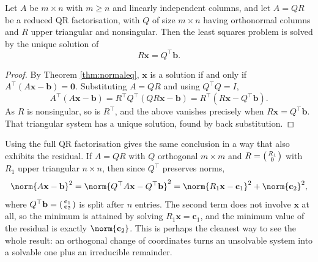 \begin{theorem}\label{thm:lsqr}
  Let $A$ be $m\times n$ with $m \geq n$ and linearly independent columns, and let $A = QR$ be a reduced QR factorisation, with $Q$ of size $m\times n$ having orthonormal columns and $R$ upper triangular and nonsingular. Then the least squares problem is solved by the unique solution of
  $$
  R\mathbf x = Q^\top\mathbf b .
  $$
\end{theorem}
\begin{proof}
  By Theorem \ref{thm:normaleq}, $\mathbf x$ is a solution if and only if $A^\top(A\mathbf x - \mathbf b) = \mathbf 0$. Substituting $A = QR$ and using $Q^\top Q = I$,
  $$
  A^\top(A\mathbf x - \mathbf b) = R^\top Q^\top(QR\mathbf x - \mathbf b) = R^\top\left(R\mathbf x - Q^\top\mathbf b\right).
  $$
  As $R$ is nonsingular, so is $R^\top$, and the above vanishes precisely when $R\mathbf x = Q^\top\mathbf b$. That triangular system has a unique solution, found by back substitution.
\end{proof}

\begin{remark}
  Using the full QR factorisation gives the same conclusion in a way that also exhibits the residual. If $A = QR$ with $Q$ orthogonal $m\times m$ and $R = \begin{psmallmatrix}R_1\\0\end{psmallmatrix}$ with $R_1$ upper triangular $n\times n$, then since $Q^\top$ preserves norms,
  $$
  \norm{A\mathbf x - \mathbf b}^2 = \norm{Q^\top A\mathbf x - Q^\top\mathbf b}^2 = \norm{R_1\mathbf x - \mathbf c_1}^2 + \norm{\mathbf c_2}^2,
  $$
  where $Q^\top\mathbf b = \begin{psmallmatrix}\mathbf c_1\\ \mathbf c_2\end{psmallmatrix}$ is split after $n$ entries. The second term does not involve $\mathbf x$ at all, so the minimum is attained by solving $R_1\mathbf x = \mathbf c_1$, and the minimum value of the residual is exactly $\norm{\mathbf c_2}$. This is perhaps the cleanest way to see the whole result: an orthogonal change of coordinates turns an unsolvable system into a solvable one plus an irreducible remainder.
\end{remark}

